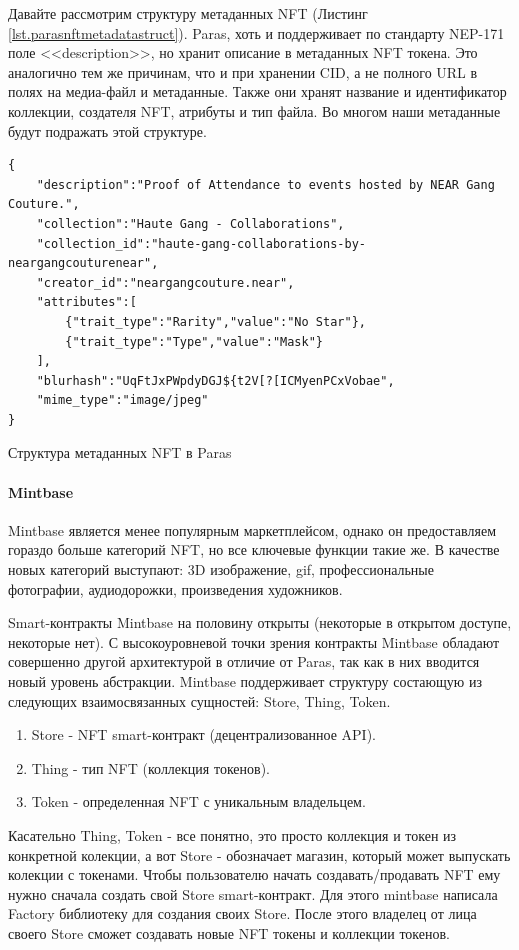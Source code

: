 Давайте рассмотрим структуру метаданных NFT (Листинг {\color{blue}\ref{lst.parasnftmetadatastruct}}). Paras, хоть и поддерживает по стандарту NEP-171 поле <<description>>, но хранит описание в метаданных NFT токена. Это аналогично тем же причинам, что и при хранении CID, а не полного URL в полях на медиа-файл и метаданные. Также они хранят название и идентификатор коллекции, создателя NFT, атрибуты и тип файла. Во многом наши метаданные будут подражать этой структуре.

\begin{listing}[H]
\begin{verbatim}
{
    "description":"Proof of Attendance to events hosted by NEAR Gang Couture.",
    "collection":"Haute Gang - Collaborations",
    "collection_id":"haute-gang-collaborations-by-neargangcouturenear",
    "creator_id":"neargangcouture.near",
    "attributes":[
        {"trait_type":"Rarity","value":"No Star"},
        {"trait_type":"Type","value":"Mask"}
    ],
    "blurhash":"UqFtJxPWpdyDGJ${t2V[?[ICMyenPCxVobae",
    "mime_type":"image/jpeg"
}
\end{verbatim}
\caption{Структура метаданных NFT в Paras}
\label{lst.parasnftmetadatastruct}
\end{listing}


\paragraph{Mintbase}

Mintbase является менее популярным маркетплейсом, однако он предоставляем гораздо больше категорий NFT, но все ключевые функции такие же. В качестве новых категорий выступают: 3D изображение, gif, профессиональные фотографии, аудиодорожки, произведения художников.

Smart-контракты Mintbase на половину открыты (некоторые в открытом доступе, некоторые нет)\cite{mintbasecontracts}. С высокоуровневой точки зрения контракты Mintbase обладают совершенно другой архитектурой в отличие от Paras, так как в них вводится новый уровень абстракции.
Mintbase поддерживает структуру состающую из следующих взаимосвязанных сущностей: Store, Thing, Token.
\begin{enumerate}
    \item Store - NFT smart-контракт (децентрализованное API).
    \item Thing - тип NFT (коллекция токенов).
    \item Token - определенная NFT с уникальным владельцем.
\end{enumerate}
Касательно Thing, Token - все понятно, это просто коллекция и токен из конкретной колекции, а вот Store - обозначает магазин, который может выпускать колекции с токенами.
Чтобы пользователю начать создавать/продавать NFT ему нужно сначала создать свой Store smart-контракт. Для этого mintbase написала Factory библиотеку для создания своих Store.
После этого владелец от лица своего Store сможет создавать новые NFT токены и коллекции токенов.

